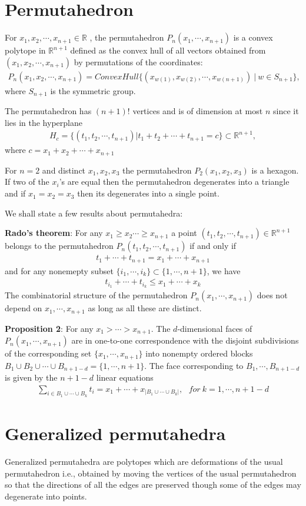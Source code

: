 \documentclass[hidelinks,12pt]{article}
\newcommand{\bea}[1]{\begin{eqnarray}\label{#1} }
\newcommand{\eea}{\end{eqnarray}}
\def\bea{\begin{eqnarray}}
\def\eea{\end{eqnarray}}
\begin{document}
\section*{Permutahedron}
 For $x_1,x_2, \cdots, x_{n+1} \in \mathbb{R} $ , the permutahedron $P_n(x_1,\cdots,x_{n+1})$ is a convex polytope in $\mathbb{R}^{n+1}$ defined as the convex hull of all vectors obtained from $(x_1,x_2, \cdots, x_{n+1})$ by permutations of the coordinates:
 \bea
 P_n(x_1,x_2, \cdots, x_{n+1}) = ConvexHull \{ (x_{w(1)},x_{w(2)}, \cdots, x_{w(n+1)})~ |~ w \in S_{n+1} \}, \nonumber
 \eea
 where $S_{n+1}$ is the symmetric group. 
 
 The permutahedron has $(n+1)!$ vertices and is of dimension at most $n$ since it lies in the hyperplane 
 \bea
 H_c= \{(t_1,t_2, \cdots, t_{n+1}) | t_1 + t_2 + \cdots + t_{n+1}= c \} \subset \mathbb{R}^{n+1}, \nonumber
 \eea
where $c= x_1+x_2+ \cdots +x_{n+1}$

For $n=2$ and distinct $x_1,x_2, x_3$ the permutahedron $P_2(x_1,x_2, x_3)$ is a hexagon. If two of the $x_i$'s are equal then the permutahedron degenerates into a triangle and if $x_1= x_2 = x_3$ then its degenerates into a single point.

We shall state a few results about permutahedra:

{\bf Rado's theorem}: For any $x_1 \ge x_2  \cdots \ge x_{n+1}$ a point $(t_1,t_2, \cdots, t_{n+1}) \in \mathbb{R}^{n+1}$ belongs to the permutahedron $P_n(t_1,t_2, \cdots, t_{n+1})$ if and only if 
\bea
t_1+ \cdots +t_{n+1} = x_1 +\cdots+ x_{n+1} \nonumber
\eea
and for any nonemepty subset $\{i_1,\cdots,i_k \} \subset \{1,\cdots, n+1 \}$, we have 
\bea
t_{i_1}+ \cdots +t_{i_k} \leq x_1 +\cdots+ x_k \nonumber
\eea
The combinatorial structure of the permutahedron $P_n (x_1, \cdots, x_{n+1}) $ does not depend on $ x_1, \cdots, x_{n+1} $ as long as all these are distinct. 

{\bf Proposition 2}: For any  $x_1> \cdots > x_{n+1} $. The $d$-dimensional faces of $P_n ( x_1, \cdots, x_{n+1 })$ are in one-to-one correspondence with the disjoint subdivisions of the corresponding set $\{x_1,\cdots, x_{n+1 }\}$ into nonempty ordered blocks $B_1 \cup B_2 \cup \cdots \cup B_{n+1-d} =\{1,\cdots,n+1 \}$. The face corresponding to $B_1,\cdots, B_{n+1-d}$ is given by the $n+1-d$ linear equations 
\bea
\sum_{i \in B_1\cup \cdots \cup B_k} t_i = x_1 + \cdots +x_{| B_1 \cup \cdots \cup B_k |}, ~~~ for~ k=1,\cdots,n+1-d \nonumber
\eea 
\section*{Generalized permutahedra}
Generalized permutahedra are polytopes which are deformations of the usual permutahedron i.e., obtained by moving the vertices of the usual permutahedron so that the directions of all the edges are preserved though some of the edges may degenerate into points.
\end{document}
